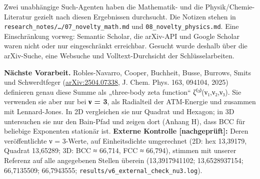Zwei unabhängige Such-Agenten haben die Mathematik- und die Physik/Chemie-Literatur gezielt nach diesen Ergebnissen durchsucht. Die Notizen stehen in \texttt{research\_notes/…/07\_novelty\_math.md} und \texttt{08\_novelty\_physics.md}. Eine Einschränkung vorweg: Semantic Scholar, die arXiv-API und Google Scholar waren nicht oder nur eingeschränkt erreichbar. Gesucht wurde deshalb über die arXiv-Suche, eine Websuche und Volltext-Durchsicht der Schlüsselarbeiten.

\textbf{Nächste Vorarbeit.} Robles-Navarro, Cooper, Buchheit, Busse, Burrows, Smits und Schwerdtfeger (\href{https://arxiv.org/abs/2504.07338}{arXiv:2504.07338}, J. Chem. Phys. 163, 094104, 2025) definieren genau diese Summe als „three-body zeta function`` ζ⁽³⁾(ν₁,ν₂,ν₃). Sie verwenden sie aber nur bei \textbf{ν = 3}, als Radialteil der ATM-Energie und zusammen mit Lennard-Jones. In 2D vergleichen sie nur Quadrat und Hexagon; in 3D untersuchen sie nur den Bain-Pfad und zeigen dort (Anhang H), dass BCC für beliebige Exponenten stationär ist. \textbf{Externe Kontrolle {[}nachgeprüft{]}:} Deren veröffentlichte ν = 3-Werte, auf Einheitsdichte umgerechnet (2D: hex 13,39179, Quadrat 13,65289; 3D: BCC ≈ 66,714, FCC ≈ 66,794), stimmen mit unserer Referenz auf alle angegebenen Stellen überein (13,3917941102; 13,6528937154; 66,7135509; 66,7943555; \texttt{results/v6\_external\_check\_nu3.log}).

